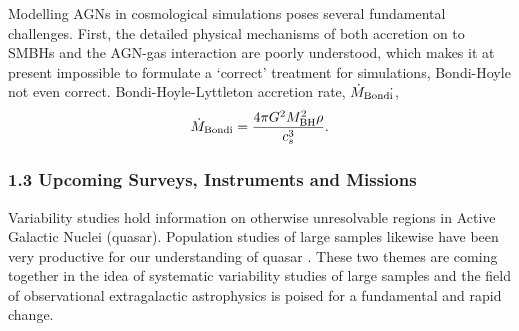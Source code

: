 \smallskip
\smallskip
\noindent
Modelling AGNs in cosmological simulations poses several fundamental
challenges. First, the detailed physical mechanisms of both accretion
on to SMBHs 
and the AGN-gas interaction
are poorly understood, which makes it at present impossible to formulate a `correct' treatment for simulations,
Bondi-Hoyle not even correct.  Bondi-Hoyle-Lyttleton accretion rate,
$\dot{M}_{\rm Bondi}$̇, \citep{Hoyle_Lyttleton1939, Bondi_Hoyle1944,
Bondi1952}
\begin{equation*}
  \dot {M}_{\rm Bondi} = \frac{4 \pi G^{2 }M_{\rm BH}^{2} \rho }{c_{s}^{3}} .
\end{equation*}

\subsubsection*{1.3 Upcoming Surveys, Instruments and Missions}
\smallskip
\smallskip
\noindent
Variability studies hold information on otherwise unresolvable regions
in Active Galactic Nuclei (quasar). Population studies of large
samples likewise have been very productive for our understanding of
quasar \citep{Lawrence2016_ASPC}.  These two themes are coming
together in the idea of systematic variability studies of large
samples and the field of observational extragalactic astrophysics is
poised for a fundamental and rapid change.

